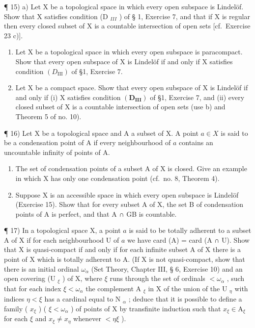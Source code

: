 ¶ 15) a) Let X be a topological space in which every open subspace is Lindelöf. Show that X satisfies condition (D \(_{III}\) ) of § 1, Exercise 7, and that if X is regular then every closed subset of X is a countable intersection of open sets {[}cf.~Exercise 23 c){]}.

\begin{enumerate}
\def\labelenumi{\alph{enumi})}
\setcounter{enumi}{1}
\item
  Let X be a topological space in which every open subspace is paracompact. Show that every open subspace of X is Lindelöf if and only if X satisfies condition \((D_{\mathrm{III}})\) of §1, Exercise 7.
\item
  Let X be a compact space. Show that every open subspace of X is Lindelöf if and only if (i) X satisfies condition \((\mathbf{D}_{\mathbf{III}})\) of §1, Exercise 7, and (ii) every closed subset of X is a countable intersection of open sets (use b) and Theorem 5 of no. 10).
\end{enumerate}

¶ 16) Let X be a topological space and A a subset of X. A point \(a \in X\) is said to be a condensation point of A if every neighbourhood of \(a\) contains an uncountable infinity of points of A.

\begin{enumerate}
\def\labelenumi{\alph{enumi})}
\item
  The set of condensation points of a subset A of X is closed. Give an example in which X has only one condensation point (cf.~no. 8, Theorem 4).
\item
  Suppose X is an accessible space in which every open subspace is Lindelöf (Exercise 15). Show that for every subset A of X, the set B of condensation points of A is perfect, and that A ∩ GB is countable.
\end{enumerate}

¶ 17) In a topological space X, a point \(a\) is said to be totally adherent to a subset A of X if for each neighbourhood U of \(a\) we have card (A) = card (A ∩ U). Show that X is quasi-compact if and only if for each infinite subset A of X there is a point of X which is totally adherent to A. (If X is not quasi-compact, show that there is an initial ordinal \(\omega_{\alpha}\) (Set Theory, Chapter III, § 6, Exercise 10) and an open covering (U \(_{\xi}\) ) of X, where \(\xi\) runs through the set of ordinals \(<\omega_{\alpha}\) , such that for each index \(\xi<\omega_{\alpha}\) the complement A \(_{\xi}\) in X of the union of the U \(_{\eta}\) with indices \(\eta<\xi\) has a cardinal equal to N \(_{\alpha}\) ; deduce that it is possible to define a family ( \(x_{\xi}\) ) ( \(\xi<\omega_{\alpha}\) ) of points of X by transfinite induction such that \(x_{\xi}\in\mathrm{A}_{\xi}\) for each \(\xi\) and \(x_{\xi}\neq x_{\eta}\) whenever \(<\eta\xi\) ).


